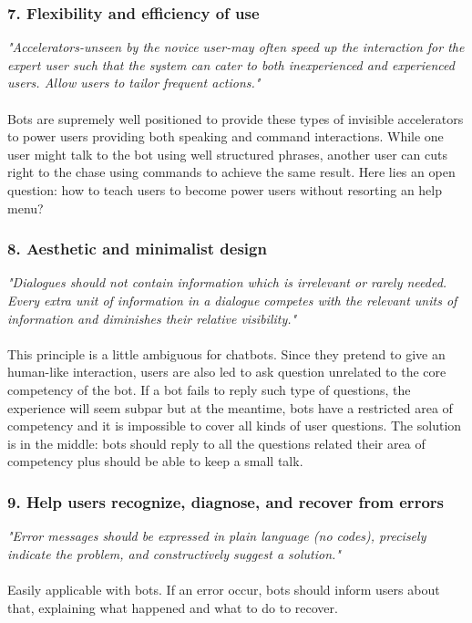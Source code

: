 \documentclass[b5paper,10pt,twoside,cucitura]{toptesi}
\begin{document}
\subsubsection{7. Flexibility and efficiency of use}
\textit{"Accelerators-unseen by the novice user-may often speed up the interaction for the expert user such that the system can cater to both inexperienced and experienced users. Allow users to tailor frequent actions."}
\\
\\
Bots are supremely well positioned to provide these types of invisible accelerators to power users providing both speaking and command interactions. While one user might talk to the bot using well structured phrases, another user can cuts right to the chase using commands to achieve the same result. Here lies an open question: how to teach users to become power users without resorting an help menu?

\subsubsection{8. Aesthetic and minimalist design}
\textit{"Dialogues should not contain information which is irrelevant or rarely needed. Every extra unit of information in a dialogue competes with the relevant units of information and diminishes their relative visibility."}
\\
\\
This principle is a little ambiguous for chatbots. Since they pretend to give an human-like interaction, users are also led to ask question unrelated to the core competency of the bot. If a bot fails to reply such type of questions, the experience will seem subpar but at the meantime, bots have a restricted area of competency and it is impossible to cover all kinds of user questions. The solution is in the middle: bots should reply to all the questions related their area of competency plus should be able to keep a small talk.


\subsubsection{9. Help users recognize, diagnose, and recover from errors}
\textit{"Error messages should be expressed in plain language (no codes), precisely indicate the problem, and constructively suggest a solution."}
\\
\\
Easily applicable with bots. If an error occur, bots should inform users about that, explaining what happened and what to do to recover.
\end{document}
